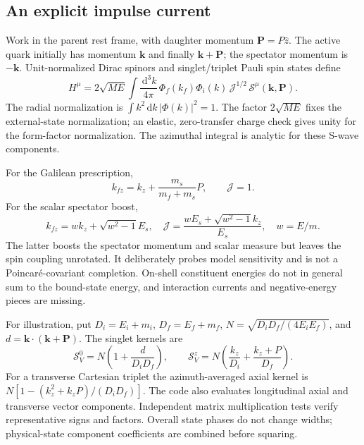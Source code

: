 \documentclass[11pt,a4paper]{article}
\newcommand{\dd}{\,\mathrm d}
\begin{document}
\subsection{An explicit impulse current}
Work in the parent rest frame, with daughter momentum $\mathbf P=P\hat z$. The active quark initially has momentum $\mathbf k$ and finally $\mathbf k+\mathbf P$; the spectator momentum is $-\mathbf k$. Unit-normalized Dirac spinors and singlet/triplet Pauli spin states define
\begin{equation}
 H^\mu=2\sqrt{M E}\int\frac{\dd^3k}{4\pi}\,
 \Phi_f(k_f)\Phi_i(k)\,\mathcal J^{1/2}\,\mathcal S^\mu(\mathbf k,\mathbf P).
\end{equation}
The radial normalization is $\int k^2\dd k\,|\Phi(k)|^2=1$. The factor $2\sqrt{ME}$ fixes the external-state normalization; an elastic, zero-transfer charge check gives unity for the form-factor normalization. The azimuthal integral is analytic for these S-wave components.

For the Galilean prescription,
\begin{equation}
 k_{fz}=k_z+\frac{m_s}{m_f+m_s}P,\qquad \mathcal J=1.
\end{equation}
For the scalar spectator boost,
\begin{equation}
 k_{fz}=w k_z+\sqrt{w^2-1}E_s,\quad
 \mathcal J=\frac{wE_s+\sqrt{w^2-1}k_z}{E_s},\quad w=E/m.
\end{equation}
The latter boosts the spectator momentum and scalar measure but leaves the spin coupling unrotated. It deliberately probes model sensitivity and is not a Poincar\'e-covariant completion. On-shell constituent energies do not in general sum to the bound-state energy, and interaction currents and negative-energy pieces are missing.

For illustration, put $D_i=E_i+m_i$, $D_f=E_f+m_f$, $N=\sqrt{D_iD_f/(4E_iE_f)}$, and $d=\mathbf k\cdot(\mathbf k+\mathbf P)$. The singlet kernels are
\begin{equation}
 \mathcal S_V^0=N\left(1+\frac d{D_iD_f}\right),\qquad
 \mathcal S_V^z=N\left(\frac{k_z}{D_i}+\frac{k_z+P}{D_f}\right).
\end{equation}
For a transverse Cartesian triplet the azimuth-averaged axial kernel is
$N[1-(k_z^2+k_zP)/(D_iD_f)]$. The code also evaluates longitudinal axial and transverse vector components. Independent matrix multiplication tests verify representative signs and factors. Overall state phases do not change widths; physical-state component coefficients are combined before squaring.
\end{document}
